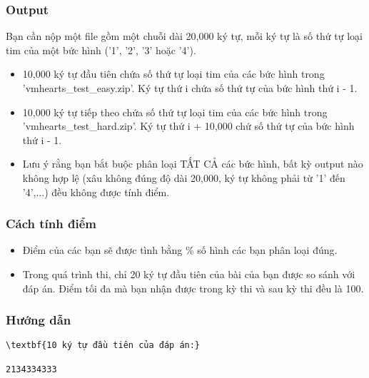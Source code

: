 \subsubsection{Output}

Bạn cần nộp một file gồm một chuỗi dài 20,000 ký tự, mỗi ký tự là số thứ tự loại tim của một bức hình ('1', '2', '3' hoặc '4').
\begin{itemize}
	\item 10,000 ký tự đầu tiên chứa số thứ tự loại tim của các bức hình trong 'vmhearts\_test\_easy.zip'. Ký tự thứ i chứa số thứ tự của bức hình thứ i - 1. 
	\item 10,000 ký tự tiếp theo chứa số thứ tự loại tim của các bức hình trong 'vmhearts\_test\_hard.zip'. Ký tự thứ i + 10,000 chứ số thứ tự của bức hình thứ i - 1. 
	\item Lưu ý rằng bạn bắt buộc phân loại TẤT CẢ các bức hình, bất kỳ output nào không hợp lệ (xâu không đúng độ dài 20,000, ký tự không phải từ '1' đến '4',...) đều không được tính điểm. 
\end{itemize}

\subsubsection{Cách tính điểm}
\begin{itemize}
	\item Điểm của các bạn sẽ được tình bằng \% số hình các bạn phân loại đúng. 
	\item Trong quá trình thi, chỉ 20 ký tự đầu tiên của bài của bạn được so sánh với đáp án. Điểm tối đa mà bạn nhận được trong kỳ thi và sau kỳ thi đều là 100.
\end{itemize}

\subsubsection{Hướng dẫn}
\begin{verbatim}
\textbf{10 ký tự đầu tiên của đáp án:}

2134334333\end{verbatim}